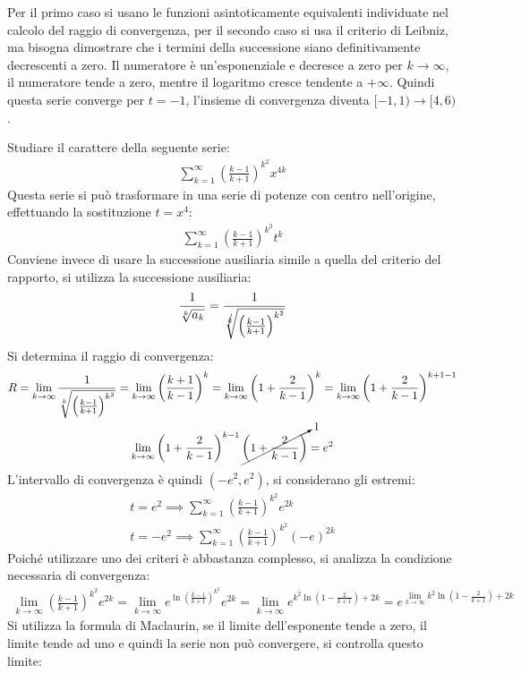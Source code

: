 \documentclass{article}
\numberwithin{equation}{subsection}
\begin{document}
Per il primo caso si usano le funzioni asintoticamente equivalenti individuate nel calcolo del raggio di convergenza, per il secondo caso si usa il criterio di Leibniz, ma bisogna dimostrare che i termini della successione siano definitivamente decrescenti a zero. Il numeratore è un'esponenziale e decresce a zero per $k\to\infty$, il numeratore tende a zero, mentre il logaritmo cresce tendente a $+\infty$. Quindi questa serie converge per $t=-1$, l'insieme di convergenza diventa $[-1,1)\to[4,6)$. 



Studiare il carattere della seguente serie:
\begin{gather*}
    \displaystyle\sum_{k=1}^\infty\left(\frac{k-1}{k+1}\right)^{k^2}x^{4k}
\end{gather*}
Questa serie si può trasformare in una serie di potenze con centro nell'origine, effettuando la sostituzione $t=x^4$:
\begin{gather*}
    \displaystyle\sum_{k=1}^\infty\left(\frac{k-1}{k+1}\right)^{k^2}t^{k}
\end{gather*}
Conviene invece di usare la successione ausiliaria simile a quella del criterio del rapporto, si utilizza la successione ausiliaria:
\begin{gather*}
    \displaystyle\frac{1}{\sqrt[k]{a_k}}=\frac{1}{\sqrt[\cancel{k}]{\left(\frac{k-1}{k+1}\right)^{k^2}}}
\end{gather*}
Si determina il raggio di convergenza:
\begin{gather*}
    R=\lim_{k\to\infty}
    \frac{1}{\sqrt[k]{\left(\frac{k-1}{k+1}\right)^{k^2}}}=
    \lim_{k\to\infty}\left(\frac{k+1}{k-1}\right)^k=
    \lim_{k\to\infty}\left(1+\frac{2}{k-1}\right)^k=
    \lim_{k\to\infty}\left(1+\frac{2}{k-1}\right)^{k+1-1}\\
    \lim_{k\to\infty}\left(1+\frac{2}{k-1}\right)^{k-1}\cancelto{1}{\left(1+\frac{2}{k-1}\right)}=e^2
\end{gather*}
L'intervallo di convergenza è quindi $(-e^2,e^2)$, si considerano gli estremi:
\begin{gather*}
    t=e^2\implies\displaystyle\sum_{k=1}^\infty\left(\frac{k-1}{k+1}\right)^{k^2}e^{2k}\\
    t=-e^2\implies\displaystyle\sum_{k=1}^\infty\left(\frac{k-1}{k+1}\right)^{k^2}(-e)^{2k}
\end{gather*}
Poiché utilizzare uno dei criteri è abbastanza complesso, si analizza la condizione necessaria di convergenza:
\begin{gather*}
    \lim_{k\to\infty}\left(\frac{k-1}{k+1}\right)^{k^2}e^{2k}=
    \lim_{k\to\infty}e^{\ln\left(\frac{k-1}{k+1}\right)^{k^2}}e^{2k}=
    \lim_{k\to\infty}e^{k^2\ln\left(1-\frac{2}{k+1}\right)+2k}=
    e^{\lim_{k\to\infty}k^2\ln\left(1-\frac{2}{k+1}\right)+2k}
\end{gather*}
Si utilizza la formula di Maclaurin, se il limite dell'esponente tende a zero, il limite tende ad uno e quindi la serie non può convergere, si controlla questo limite:
\end{document}
